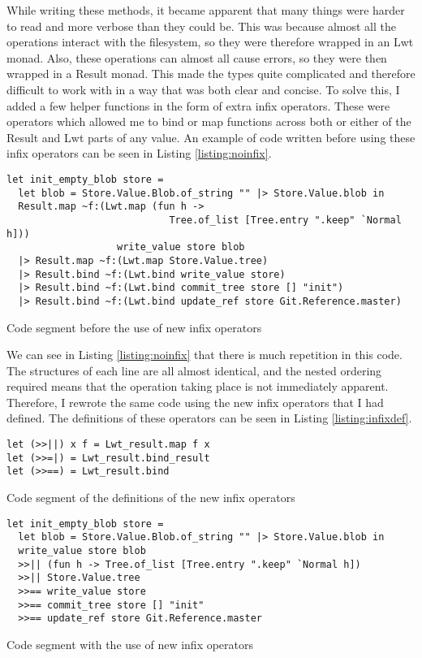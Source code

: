 While writing these methods, it became apparent that many things were harder to read and more verbose than they could be. This was because almost all the operations interact with the filesystem, so they were therefore wrapped in an Lwt monad. Also, these operations can almost all cause errors, so they were then wrapped in a Result monad. This made the types quite complicated and therefore difficult to work with in a way that was both clear and concise. To solve this, I added a few helper functions in the form of extra infix operators. These were operators which allowed me to bind or map functions across both or either of the Result and Lwt parts of any value. An example of code written before using these infix operators can be seen in Listing \ref{listing:noinfix}.

\begin{listing}[h]
\begin{verbatim}
let init_empty_blob store =
  let blob = Store.Value.Blob.of_string "" |> Store.Value.blob in
  Result.map ~f:(Lwt.map (fun h ->
                            Tree.of_list [Tree.entry ".keep" `Normal h]))
                   write_value store blob
  |> Result.map ~f:(Lwt.map Store.Value.tree)
  |> Result.bind ~f:(Lwt.bind write_value store)
  |> Result.bind ~f:(Lwt.bind commit_tree store [] "init")
  |> Result.bind ~f:(Lwt.bind update_ref store Git.Reference.master)
\end{verbatim}
\caption{Code segment before the use of new infix operators}
\label{listing:noinfix}
\end{listing}

We can see in Listing \ref{listing:noinfix} that there is much repetition in this code. The structures of each line are all almost identical, and the nested ordering required means that the operation taking place is not immediately apparent. Therefore, I rewrote the same code using the new infix operators that I had defined. The definitions of these operators can be seen in Listing \ref{listing:infixdef}.

\begin{listing}[h]
\begin{verbatim}
let (>>||) x f = Lwt_result.map f x
let (>>=|) = Lwt_result.bind_result
let (>>==) = Lwt_result.bind
\end{verbatim}
\caption{Code segment of the definitions of the new infix operators}
\label{listing:infixdef}
\end{listing}

\begin{listing}[h]
\begin{verbatim}
let init_empty_blob store =
  let blob = Store.Value.Blob.of_string "" |> Store.Value.blob in
  write_value store blob
  >>|| (fun h -> Tree.of_list [Tree.entry ".keep" `Normal h])
  >>|| Store.Value.tree
  >>== write_value store
  >>== commit_tree store [] "init"
  >>== update_ref store Git.Reference.master
\end{verbatim}
\caption{Code segment with the use of new infix operators}
\label{listing:infix}
\end{listing}

